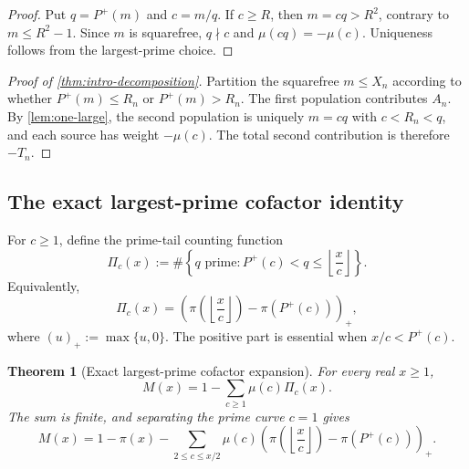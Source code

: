 \documentclass[11pt]{article}
\newtheorem{theorem}{Theorem}[section]
\theoremstyle{definition}
\theoremstyle{remark}
\newcommand{\Pplus}{P^{+}}
\newcommand{\1}{\mathbf{1}}
\begin{document}
\begin{proof}
Put $q=\Pplus(m)$ and $c=m/q$.  If $c\ge R$, then $m=cq>R^2$, contrary to $m\le R^2-1$.  Since $m$ is squarefree, $q\nmid c$ and $\mu(cq)=-\mu(c)$.  Uniqueness follows from the largest-prime choice.
\end{proof}

\begin{proof}[Proof of \cref{thm:intro-decomposition}]
Partition the squarefree $m\le X_n$ according to whether $\Pplus(m)\le R_n$ or $\Pplus(m)>R_n$.  The first population contributes $A_n$.  By \cref{lem:one-large}, the second population is uniquely $m=cq$ with $c<R_n<q$, and each source has weight $-\mu(c)$.  The total second contribution is therefore $-T_n$.
\end{proof}


\subsection{The exact largest-prime cofactor identity}
\label{subsec:central-identity}

For $c\ge1$, define the prime-tail counting function
\begin{equation}
 \Pi_c(x)
 :=
 \#\left\{
 q\text{ prime}:
 \Pplus(c)<q\le\left\lfloor\frac{x}{c}\right\rfloor
 \right\}.
 \label{eq:Pi-c}
\end{equation}
Equivalently,
\begin{equation}
 \Pi_c(x)
 =
 \left(
 \pi\!\left(\left\lfloor\frac{x}{c}\right\rfloor\right)
 -\pi(\Pplus(c))
 \right)_{+},
 \label{eq:Pi-c-positive-part}
\end{equation}
where $(u)_+:=\max\{u,0\}$.  The positive part is essential when
$x/c<\Pplus(c)$.

\begin{theorem}[Exact largest-prime cofactor expansion]
\label{thm:central-M-identity}
For every real $x\ge1$,
\begin{equation}
 \boxed{
 M(x)
 =
 1-\sum_{c\ge1}\mu(c)\Pi_c(x).
 }
 \label{eq:central-M-identity-compact}
\end{equation}
The sum is finite, and separating the prime curve $c=1$ gives
\begin{equation}
 \boxed{
 M(x)
 =
 1-\pi(x)
 -\sum_{2\le c\le x/2}
 \mu(c)
 \left(
 \pi\!\left(\left\lfloor\frac{x}{c}\right\rfloor\right)
 -\pi(\Pplus(c))
 \right)_{+}.
 }
 \label{eq:central-M-identity}
\end{equation}
\end{theorem}
\end{document}
